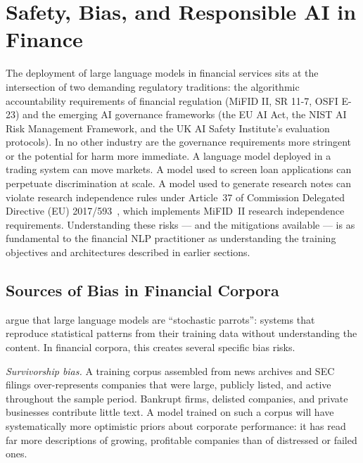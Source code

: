 
\section{Safety, Bias, and Responsible AI in Finance}
\label{sec:safety}

\begin{context}
The deployment of large language models in financial services sits at the
intersection of two demanding regulatory traditions: the algorithmic accountability
requirements of financial regulation (MiFID II, SR 11-7, OSFI E-23) and the
emerging AI governance frameworks (the EU AI Act, the NIST AI Risk Management
Framework, and the UK AI Safety Institute's evaluation protocols).  In no other
industry are the governance requirements more stringent or the potential for harm
more immediate.  A language model deployed in a trading system can move markets.
A model used to screen loan applications can perpetuate discrimination at scale.
A model used to generate research notes can violate research independence rules
under Article~37 of Commission Delegated Directive (EU) 2017/593~\citep{esma2018mifid2}, which implements MiFID~II research independence requirements.  Understanding these risks --- and the mitigations
available --- is as fundamental to the financial NLP practitioner as understanding
the training objectives and architectures described in earlier sections.

\subsection{Sources of Bias in Financial Corpora}
\label{subsec:bias}

\citet{bender2021stochastic} argue that large language models are ``stochastic
parrots'': systems that reproduce statistical patterns from their training data
without understanding the content.  In financial corpora, this creates several
specific bias risks.

\emph{Survivorship bias.}  A training corpus assembled from news archives and
SEC filings over-represents companies that were large, publicly listed, and
active throughout the sample period.  Bankrupt firms, delisted companies, and
private businesses contribute little text.  A model trained on such a corpus
will have systematically more optimistic priors about corporate performance:
it has read far more descriptions of growing, profitable companies than of
distressed or failed ones.


\end{context}
